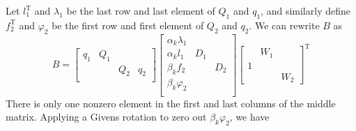 \documentclass[12pt]{article}
\newcommand{\op}{\operatorname}
\begin{document}
Let \(l_1^{\op{T}}\) and \(\lambda_1\) be the last row and last element of \(Q_1\) and \(q_1\), and similarly define \(f_2^{\op T}\) and \(\varphi_2\) be the first row and first element of \(Q_2\) and \(q_2\). We can rewrite \(B\) as
\[
    B = \begin{bmatrix}
        q_1 & Q_1 \\
        & & Q_2 & q_2 \\
    \end{bmatrix}
    \begin{bmatrix}
        \boxed{\alpha_k \lambda_1} \\
        \alpha_k l_1 & D_1 \\
        \beta_k f_2 &  & D_2 \\
        \boxed{\beta_k \varphi_2}  \\
    \end{bmatrix}
    \begin{bmatrix}
        & W_1 \\
        1 \\
        & & W_2
    \end{bmatrix}^{\op T}
\]
There is only one nonzero element in the first and last columns of the middle matrix. Applying a Givens rotation to zero out \(\beta_k \varphi_2\), we have
\end{document}

